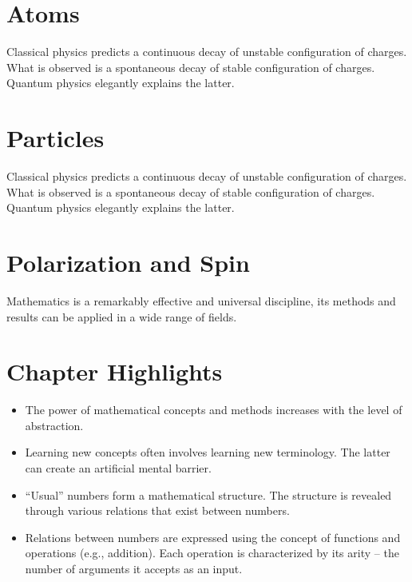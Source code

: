 \section{Atoms}
Classical physics predicts a continuous decay of unstable configuration of charges. What is observed is a spontaneous decay of stable configuration of charges. Quantum physics elegantly explains the latter.  

\section{Particles}
Classical physics predicts a continuous decay of unstable configuration of charges. What is observed is a spontaneous decay of stable configuration of charges. Quantum physics elegantly explains the latter.  

\section{Polarization and Spin}
Mathematics is a remarkably effective and universal discipline, its
methods and
results can be applied in a wide range of fields.

\section*{Chapter Highlights}
{\chhc
  \it  
\begin{itemize}
\item The power of mathematical concepts and methods increases with
  the level of abstraction.
\item Learning new concepts often involves learning new
  terminology. The latter can create an artificial mental barrier.
\item ``Usual'' numbers form a mathematical structure. The structure
  is revealed through various relations that exist between numbers.
\item Relations between numbers are expressed using the concept of
  functions and operations (e.g., addition). Each operation is
  characterized by its arity -- the number of arguments it accepts as
  an input.
\end{itemize}


}

